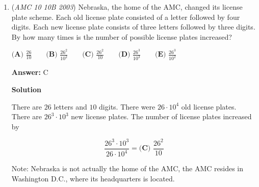 \begin{enumerate}
 \[25^{-2} = \frac{5^{48/x}}{5^{26/x} \cdot 25^{17/x}}.\]
$\textbf{(A) } 2 \qquad\textbf{(B) } 3 \qquad\textbf{(C) } 5 \qquad\textbf{(D) } 6 \qquad\textbf{(E) } 9$

 \textbf{Answer: }B



\textbf{Solution}

Manipulate the powers of $5$ in order to get a clean expression.

 
 \[\frac{5^{\frac{48}{x}}}{5^{\frac{26}{x}} \cdot 25^{\frac{17}{x}}} = \frac{5^{\frac{48}{x}}}{5^{\frac{26}{x}} \cdot 5^{\frac{34}{x}}} = 5^{\frac{48}{x}-(\frac{26}{x}+\frac{34}{x})} = 5^{-\frac{12}{x}}\]
 \[25^{-2} = (5^2)^{-2} = 5^{-4}\]
 \[5^{-4} = 5^{-\frac{12}{x}}\]

 If two numbers are equal, and their bases are equal, then their exponents are equal as well.  Set the two exponents equal to each other.

 
 \begin{align*}-4&=\frac{-12}{x}\\ -4x&=-12\\ x&=\boxed{\textbf{(B) \ } 3}\end{align*}




	\item (\textit{AMC 10 10B 2003}) Nebraska, the home of the AMC, changed its license plate scheme. Each old license plate consisted of a letter followed by four digits. Each new license plate consists of three letters followed by three digits. By how many times is the number of possible license plates increased?


 $\textbf{(A) } \frac{26}{10} \qquad\textbf{(B) } \frac{26^2}{10^2} \qquad\textbf{(C) } \frac{26^2}{10} \qquad\textbf{(D) } \frac{26^3}{10^3} \qquad\textbf{(E) } \frac{26^3}{10^2}$

 \textbf{Answer: }C



\textbf{Solution}

There are $26$ letters and $10$ digits. There were $26 \cdot 10^4$ old license plates. There are $26^3 \cdot 10^3$ new license plates. The number of license plates increased by

 
 \[\frac{26^3 \cdot 10^3}{26 \cdot 10^4} = \boxed{\textbf{(C) \ } \frac{26^2}{10}}\]

 Note: Nebraska is not actually the home of the AMC, the AMC resides in Washington D.C., where its headquarters is located.

 



\end{enumerate}
